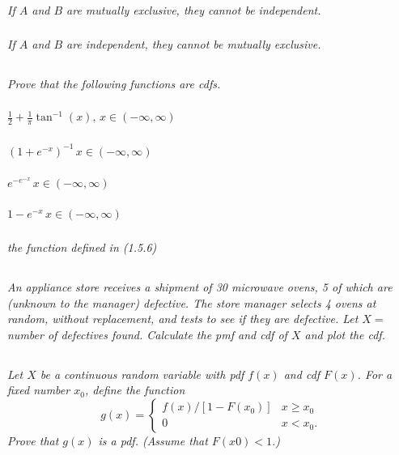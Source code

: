 \documentclass[12pt]{amsart}
\begin{document}
	\subsubsection{} \textit{If \(A\) and \(B\) are mutually exclusive, they cannot be independent.}
	\subsubsection{} \textit{If \(A\) and \(B\) are independent, they cannot be mutually exclusive.}

\setcounter{subsection}{46}
\subsection{} %
\textit{Prove that the following functions are cdfs.}
	\subsubsection{} \( \frac{1}{2}+\frac{1}{\pi} \tan^{-1}(x),\, x\in(-\infty,\infty) \)
	\subsubsection{} \( (1+e^{-x})^{-1}\, x\in(-\infty,\infty) \)
	\subsubsection{} \( e^{-e^{-x}}\, x\in(-\infty,\infty) \)
	\subsubsection{} \( 1-e^{-x}\, x\in(-\infty,\infty) \)
	\subsubsection{} \textit{the function defined in (1.5.6)}

\setcounter{subsection}{50}
\subsection{} %
\textit{An appliance store receives a shipment of 30 microwave ovens, 5 of which are (unknown
	to the manager) defective. The store manager selects 4 ovens at random, without
	replacement, and tests to see if they are defective. Let \(X =\) number of defectives
	found. Calculate the pmf and cdf of \(X\) and plot the cdf.}


\subsection{} %
\textit{Let \(X\) be a continuous random variable with pdf \(f(x)\) and cdf \(F(x)\). For a fixed number \(x_0\), define the function
	\[g(x) = \begin{cases}
		f(x)/[1 − F(x_0)] & x\geq x_0 \\
		0 & x < x_0.
	\end{cases} \]
	Prove that \(g(x)\) is a pdf. (Assume that \(F(x0) < 1\).)}
\end{document}
